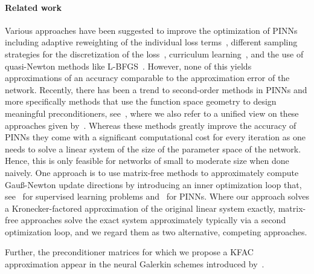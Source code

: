 \paragraph{Related work}
Various approaches have been suggested to improve the optimization of PINNs including adaptive reweighting of the individual loss terms~\citep{wang2021understanding,van2022optimally,wang2022and}, different sampling strategies for the discretization of the loss~\citep{lu2021deepxde, nabian2021efficient, daw2022rethinking,zapf2022investigating, wang2022respecting, wu2023comprehensive}, curriculum learning~\citep{krishnapriyan2021characterizing, wang2022respecting}, and the use of quasi-Newton methods like L-BFGS~\citep{markidis2021old}. 
However, none of this yields approximations of an accuracy comparable to the approximation error of the network. 
Recently, there has been a trend to second-order methods in PINNs and more specifically methods that use the function space geometry to design meaningful preconditioners, see~\cite{zeng2022competitive, muller2023achieving, de2023operator, liu2024preconditioning, jnini2024gauss,chen2024teng, zampini2024petscml}, where we also refer to a unified view on these approaches given by~\cite{muller2024optimization}. 
Whereas these methods greatly improve the accuracy of PINNs they come with a significant computational cost for every iteration as one needs to solve a linear system of the size of the parameter space of the network. 
Hence, this is only feasible for networks of small to moderate size when done naively. 
One approach is to use matrix-free methods to approximately compute Gauß-Newton update directions by introducing an inner optimization loop that, see~\cite{schraudolph2002fast,martens2010deep} for supervised learning problems and~\cite{zeng2022competitive,bonfanti2024challenges, jnini2024gauss,zampini2024petscml} for PINNs. 
Where our approach solves a Kronecker-factored approximation of the original linear system exactly, matrix-free approaches solve the exact system approximately typically via a second optimization loop, and we regard them as two alternative, competing approaches. %

Further, the preconditioner matrices for which we propose a KFAC approximation appear in the neural Galerkin schemes introduced by~\cite{bruna2024neural}. 

